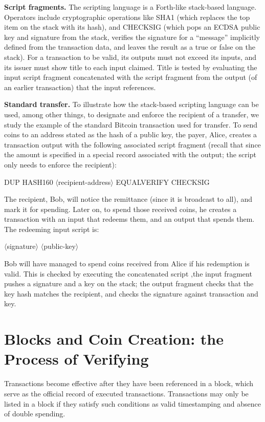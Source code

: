 \textbf{Script fragments.} The scripting language is a Forth-like stack-based language. Operators
include cryptographic operations like SHA1 (which replaces the top item on the
stack with its hash), and CHECKSIG (which pops an ECDSA public key and signature
from the stack, verifies the signature for a “message” implicitly defined from the transaction
data, and leaves the result as a true or false on the stack). For a transaction to be
valid, its outputs must not exceed its inputs, and its issuer must show title to each input
claimed. Title is tested by evaluating the input script fragment concatenated with the
script fragment from the output (of an earlier transaction) that the input references\cite{barber2012bitter}.

\textbf{Standard transfer.} To illustrate how the stack-based scripting language can be used,
among other things, to designate and enforce the recipient of a transfer, we study the example
of the standard Bitcoin transaction used for transfer. To send coins to an address
stated as the hash of a public key, the payer, Alice, creates a transaction output with
the following associated script fragment (recall that since the amount is specified in a
special record associated with the output; the script only needs to enforce the recipient):

DUP HASH160 $\langle$recipient-address$\rangle$  EQUALVERIFY CHECKSIG        

The recipient, Bob, will notice the remittance (since it is broadcast to all), and mark it
for spending. Later on, to spend those received coins, he creates a transaction with an
input that redeems them, and an output that spends them. The redeeming input script is:

$\langle$signature$\rangle$ $\langle$public-key$\rangle$ 

Bob will have managed to spend coins received from Alice if his redemption is valid.
This is checked by executing the concatenated script ,the input fragment  pushes a signature and a key on the stack; the output fragment  checks that the key
hash matches the recipient, and checks the signature against transaction and key.

\section{Blocks and Coin Creation: the Process of Verifying}
Transactions become effective after they have been referenced in a block, which serve as
the official record of executed transactions. Transactions may only be listed in a block
if they satisfy such conditions as valid timestamping and absence of double spending\cite{barber2012bitter}.

